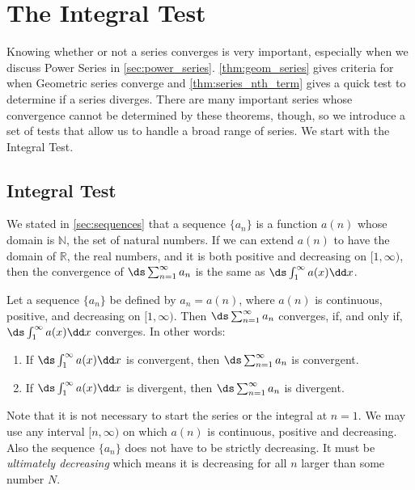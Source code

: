 \section{The Integral Test}\label{sec:int_tests}

Knowing whether or not a series converges is very important, especially when we discuss Power Series in \autoref{sec:power_series}. \autoref{thm:geom_series} gives criteria for when Geometric series converge and \autoref{thm:series_nth_term} gives a quick test to determine if a series diverges. There are many important series whose convergence cannot be determined by these theorems, though, so we introduce a set of tests that allow us to handle a broad range of series. We start with the Integral Test.


\subsection{Integral Test}

We stated in \autoref{sec:sequences} that a sequence $\{a_n\}$ is a function $a(n)$ whose domain is $\mathbb{N}$, the set of natural numbers. If we can extend $a(n)$ to have the domain of $\mathbb{R}$, the real numbers, and it is both positive and decreasing on $[1,\infty)$, then the convergence of $\ds \sum_{n=1}^\infty a_n$ is the same as $\ds\int_1^\infty a(x)\dd x$. 

\begin{theorem}\label{thm:integral_test}
Let a sequence $\{a_n\}$ be defined by $a_n=a(n)$, where $a(n)$ is continuous, positive, and decreasing on $[1,\infty)$. Then $\ds \sum_{n=1}^\infty a_n$ converges, if, and only if, $\ds\int_1^\infty a(x)\dd x$ converges. In other words:
\begin{enumerate}
\item If $\ds \int_1^\infty a(x)\dd x$ is convergent, then $\ds \sum_{n=1}^\infty a_n$ is convergent.
\item If $\ds \int_1^\infty a(x)\dd x$ is divergent, then $\ds \sum_{n=1}^\infty a_n$ is divergent.
\end{enumerate}
\end{theorem}


Note that it is not necessary to start the series or the integral at $n=1$. We may use any interval $[n,\infty)$ on which $a(n)$ is continuous, positive and decreasing. Also the sequence $\{a_n\}$ does not have to be strictly decreasing. It must be \emph{ultimately decreasing} which means it is decreasing for all $n$ larger than some number $N$.\bigskip



